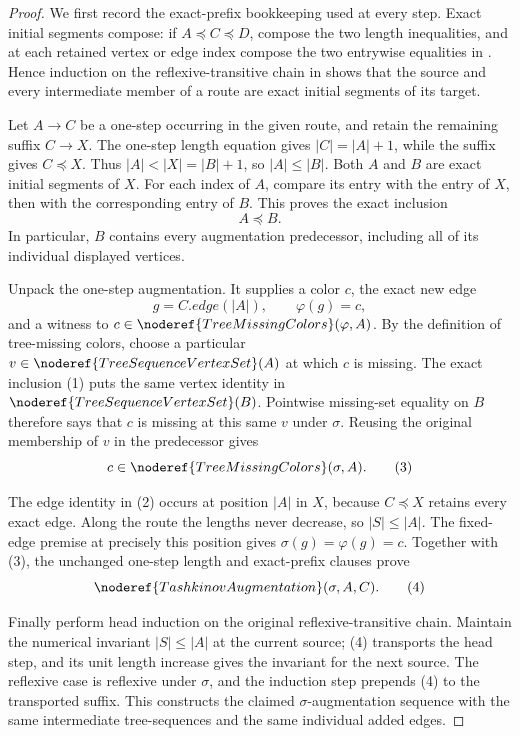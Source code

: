 \begin{proof}
We first record the exact-prefix bookkeeping used at every step.  Exact
initial segments compose: if \(A\preccurlyeq C\preccurlyeq D\), compose
the two length inequalities, and at each retained vertex or edge index
compose the two entrywise equalities in
.  Hence induction on the
reflexive-transitive chain in
 shows that the source and every
intermediate member of a route are exact initial segments of its target.

Let \(A\to C\) be a one-step
 occurring in the given route, and retain
the remaining suffix \(C\to X\).  The one-step length equation gives
\(|C|=|A|+1\), while the suffix gives \(C\preccurlyeq X\).  Thus
\(|A|<|X|=|B|+1\), so \(|A|\leq|B|\).  Both \(A\) and \(B\) are exact
initial segments of \(X\).  For each index of \(A\), compare its entry
with the entry of \(X\), then with the corresponding entry of \(B\).
This proves the exact inclusion
\[
                         A\preccurlyeq B.                    \tag{1}
\]
In particular, \(B\) contains every augmentation predecessor, including
all of its individual displayed vertices.

Unpack the one-step augmentation.  It supplies a color \(c\), the exact
new edge
\[
 g=C.\mathit{edge}(|A|),\qquad \varphi(g)=c,                 \tag{2}
\]
and a witness to
\(c\in\noderef{TreeMissingColors}(\varphi,A)\).  By the definition of
tree-missing colors, choose a particular
\(v\in\noderef{TreeSequenceVertexSet}(A)\) at which \(c\) is missing.
The exact inclusion (1) puts the same vertex identity in
\(\noderef{TreeSequenceVertexSet}(B)\).  Pointwise missing-set equality
on \(B\) therefore says that \(c\) is missing at this same \(v\) under
\(\sigma\).  Reusing the original membership of \(v\) in the predecessor
gives
\[
                   c\in\noderef{TreeMissingColors}(\sigma,A). \tag{3}
\]

The edge identity in (2) occurs at position \(|A|\) in \(X\), because
\(C\preccurlyeq X\) retains every exact edge.  Along the route the lengths
never decrease, so \(|S|\leq|A|\).  The fixed-edge premise at precisely
this position gives \(\sigma(g)=\varphi(g)=c\).  Together with (3), the
unchanged one-step length and exact-prefix clauses prove
\[
                  \noderef{TashkinovAugmentation}(\sigma,A,C). \tag{4}
\]

Finally perform head induction on the original reflexive-transitive
chain.  Maintain the numerical invariant \(|S|\leq|A|\) at the current
source; (4) transports the head step, and its unit length increase gives
the invariant for the next source.  The reflexive case is reflexive under
\(\sigma\), and the induction step prepends (4) to the transported suffix.
This constructs the claimed \(\sigma\)-augmentation sequence with the
same intermediate tree-sequences and the same individual added edges.
\end{proof}
